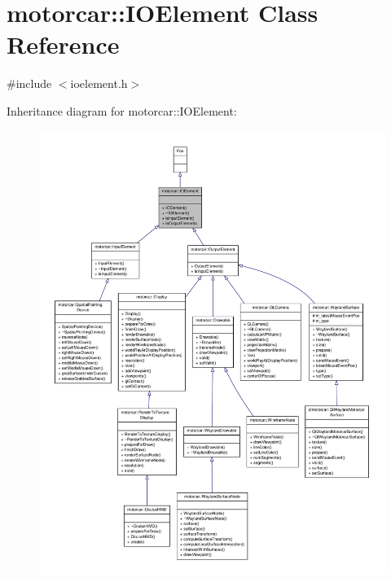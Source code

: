 \hypertarget{classmotorcar_1_1IOElement}{\section{motorcar\-:\-:I\-O\-Element Class Reference}
\label{classmotorcar_1_1IOElement}
}


{\ttfamily \#include $<$ioelement.\-h$>$}



Inheritance diagram for motorcar\-:\-:I\-O\-Element\-:
\nopagebreak
\begin{figure}[H]
\begin{center}
\leavevmode
\includegraphics[width=350pt]{classmotorcar_1_1IOElement__inherit__graph}
\end{center}
\end{figure}


